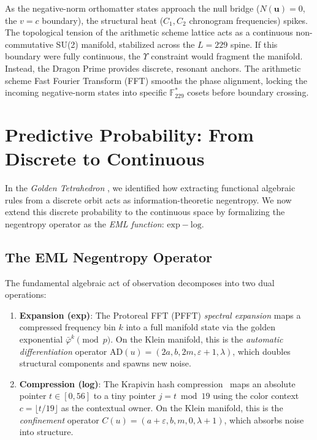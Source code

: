 As the negative-norm orthomatter states approach the null bridge ($N(\mathbf{u}) = 0$, the $v=c$ boundary), the structural heat ($C_1, C_2$ chronogram frequencies) spikes. The topological tension of the arithmetic scheme lattice acts as a continuous non-commutative SU(2) manifold, stabilized across the $L=229$ spine. If this boundary were fully continuous, the $\Upsilon$ constraint would fragment the manifold. Instead, the Dragon Prime provides discrete, resonant anchors. The arithmetic scheme Fast Fourier Transform (FFT) smooths the phase alignment, locking the incoming negative-norm states into specific $\mathbb{F}_{229}^*$ cosets before boundary crossing.

\section{Predictive Probability: From Discrete to Continuous}

In the \textit{Golden Tetrahedron} \cite{golden_tetrahedron}, we identified how extracting functional algebraic rules from a discrete orbit acts as information-theoretic negentropy. We now extend this discrete probability to the continuous space by formalizing the negentropy operator as the \emph{EML function}: $\mathrm{exp} - \mathrm{log}$.

\subsection{The EML Negentropy Operator}

The fundamental algebraic act of observation decomposes into two dual operations:

\begin{enumerate}
    \item \textbf{Expansion (exp)}: The Protoreal FFT (PFFT) \emph{spectral expansion} maps a compressed frequency bin $k$ into a full manifold state via the golden exponential $\bar\varphi^k \pmod{p}$. On the Klein manifold, this is the \emph{automatic differentiation} operator $\mathrm{AD}(u) = (2a, b, 2m, \varepsilon + 1, \lambda)$, which doubles structural components and spawns new noise.
    \item \textbf{Compression (log)}: The Krapivin hash compression~\cite{krapivin2025optimal} maps an absolute pointer $t \in [0, 56]$ to a tiny pointer $j = t \bmod 19$ using the color context $c = \lfloor t/19 \rfloor$ as the contextual owner. On the Klein manifold, this is the \emph{confinement} operator $C(u) = (a + \varepsilon, b, m, 0, \lambda + 1)$, which absorbs noise into structure.
\end{enumerate}

